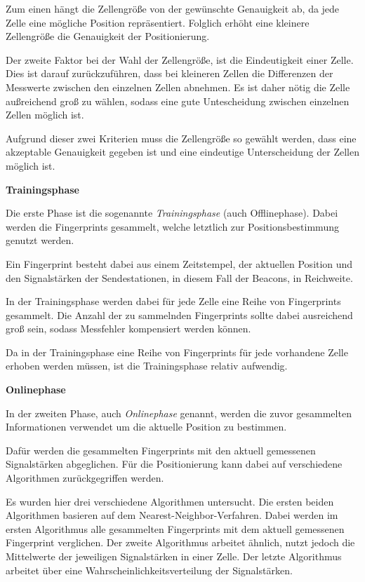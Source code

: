 Zum einen hängt die Zellengröße von der gewünschte Genauigkeit ab, da jede Zelle eine mögliche Position repräsentiert. Folglich erhöht eine kleinere Zellengröße die Genauigkeit der Positionierung.

Der zweite Faktor bei der Wahl der Zellengröße, ist die Eindeutigkeit einer Zelle. Dies ist darauf zurückzuführen, dass bei kleineren Zellen die Differenzen der Messwerte zwischen den einzelnen Zellen abnehmen.
Es ist daher nötig die Zelle außreichend groß zu wählen, sodass eine gute Untescheidung zwischen einzelnen Zellen möglich ist.

Aufgrund dieser zwei Kriterien muss die Zellengröße so gewählt werden, dass eine akzeptable Genauigkeit gegeben ist und eine eindeutige Unterscheidung der Zellen möglich ist.


\textbf{Trainingsphase}


Die erste Phase ist die sogenannte \emph{Trainingsphase} (auch Offlinephase). Dabei werden die Fingerprints gesammelt, welche letztlich zur Positionsbestimmung genutzt werden.

Ein Fingerprint besteht dabei aus einem Zeitstempel, der aktuellen Position und den Signalstärken der Sendestationen, in diesem Fall der Beacons, in Reichweite.

In der Trainingsphase werden dabei für jede Zelle eine Reihe von Fingerprints gesammelt. Die Anzahl der zu sammelnden Fingerprints sollte dabei ausreichend groß sein, sodass Messfehler kompensiert werden können.

Da in der Trainingsphase eine Reihe von Fingerprints für jede vorhandene Zelle erhoben werden müssen, ist die Trainingsphase relativ aufwendig.


\textbf{Onlinephase}


In der zweiten Phase, auch \emph{Onlinephase} genannt, werden die zuvor gesammelten Informationen verwendet um die aktuelle Position zu bestimmen. 

Dafür werden die gesammelten Fingerprints mit den aktuell gemessenen Signalstärken abgeglichen. Für die Positionierung kann dabei auf verschiedene Algorithmen zurückgegriffen werden.

Es wurden hier drei verschiedene Algorithmen untersucht. Die ersten beiden Algorithmen basieren auf dem Nearest-Neighbor-Verfahren. Dabei werden im ersten Algorithmus alle gesammelten Fingerprints mit dem aktuell gemessenen Fingerprint verglichen. Der zweite Algorithmus arbeitet ähnlich, nutzt jedoch die Mittelwerte der jeweiligen Signalstärken in einer Zelle. 
Der letzte Algorithmus arbeitet über eine Wahrscheinlichkeitsverteilung der Signalstärken.


